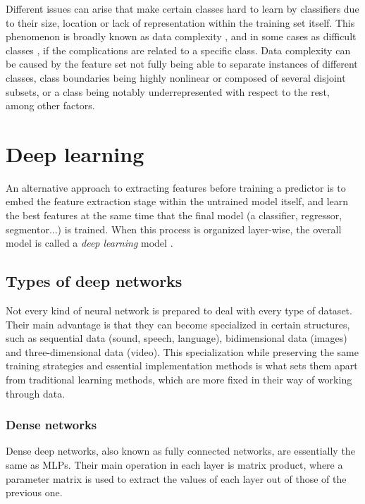 
Different issues can arise that make certain classes hard to learn by classifiers due to their size, location or lack of representation within the training set itself. This phenomenon is broadly known as data complexity , and in some cases as difficult classes , if the complications are related to a specific class. Data complexity can be caused by the feature set not fully being able to separate instances of different classes, class boundaries being highly nonlinear or composed of several disjoint subsets, or a class being notably underrepresented with respect to the rest, among other factors.


\section{Deep learning}

An alternative approach to extracting features before training a predictor 
is to embed the feature extraction stage within the untrained model itself, and learn the best features at the same time that the final model (a classifier, regressor, segmentor...) is trained. When this process is organized layer-wise, the overall model is called a \textit{deep learning} model .

\subsection{Types of deep networks}

Not every kind of neural network is prepared to deal with every type of dataset. Their main advantage is that they can become specialized in certain structures, such as sequential data (sound, speech, language), bidimensional data (images) and three-dimensional data (video). This specialization while preserving the same training strategies and essential implementation methods is what sets them apart from traditional learning methods, which are more fixed in their way of working through data.

\subsubsection{Dense networks}

Dense deep networks, also known as fully connected networks, are essentially the same as MLPs. Their main operation in each layer is matrix product, where a parameter matrix is used to extract the values of each layer out of those of the previous one. 

